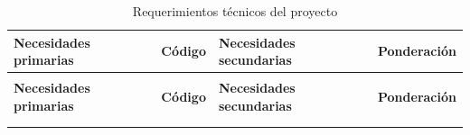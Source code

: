 \documentclass[../../DocumentoCompleto.tex]{subfiles}
\begin{document}
\begin{longtable}{>{\raggedright\arraybackslash}p{4cm} c p{7cm} c}
\caption{Requerimientos técnicos del proyecto}
\label{tab:requerimientos_tecnicos} \\
\toprule
\textbf{Necesidades primarias} & \textbf{Código} & \textbf{Necesidades secundarias} & \textbf{Ponderación} \\
\midrule
\endfirsthead

\multicolumn{4}{c}{{\bfseries \tablename\ \thetable{} -- continuación}} \\
\toprule
\textbf{Necesidades primarias} & \textbf{Código} & \textbf{Necesidades secundarias} & \textbf{Ponderación} \\
\midrule
\endhead

\midrule
\multicolumn{4}{r}{{}} \\
\endfoot

\bottomrule
\endlastfoot


\end{longtable}
\end{document}
